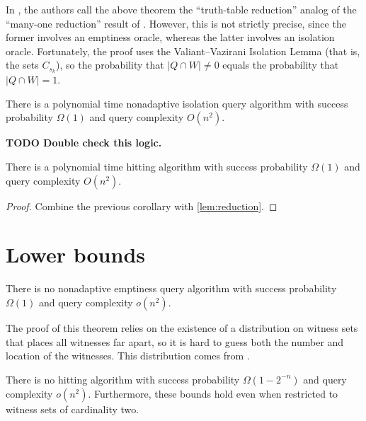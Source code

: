 \documentclass{article}
\newcommand{\todo}[1]{\textbf{TODO #1}}
\begin{document}
In \autocite{krw12}, the authors call the above theorem the ``truth-table reduction'' analog of the ``many-one reduction'' result of \autocite[Theorem~4.2]{dkvmw13}.
However, this is not strictly precise, since the former involves an emptiness oracle, whereas the latter involves an isolation oracle.
Fortunately, the proof uses the Valiant--Vazirani Isolation Lemma (that is, the sets $C_{s_k}$), so the probability that $|Q \cap W| \neq 0$ equals the probability that $|Q \cap W| = 1$.

\begin{corollary}
  There is a polynomial time nonadaptive isolation query algorithm with success probability $\Omega(1)$ and query complexity $O(n^2)$.
\end{corollary}

\todo{Double check this logic.}

\begin{corollary}
  There is a polynomial time hitting algorithm with success probability $\Omega(1)$ and query complexity $O(n^2)$.
\end{corollary}
\begin{proof}
  Combine the previous corollary with \autoref{lem:reduction}.
\end{proof}

\section{Lower bounds}

\begin{theorem}\label{thm:nonadaptiveemptiness}
  There is no nonadaptive emptiness query algorithm with success probability $\Omega(1)$ and query complexity $o(n^2)$.
\end{theorem}

The proof of this theorem relies on the existence of a distribution on witness sets that places all witnesses far apart, so it is hard to guess both the number and location of the witnesses.
This distribution comes from \autocite[Theorem~4.2]{dkvmw13}.

\begin{theorem}
  There is no hitting algorithm with success probability $\Omega(1 - 2^{-n})$ and query complexity $o(n^2)$.
  Furthermore, these bounds hold even when restricted to witness sets of cardinality two.
\end{theorem}
\end{document}
